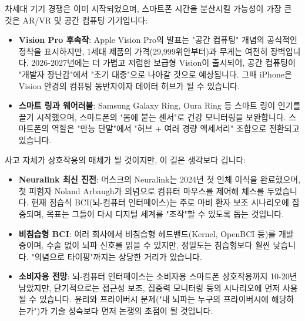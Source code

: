 


차세대 기기 경쟁은 이미 시작되었으며, 스마트폰 시간을 분산시킬 가능성이 가장 큰 것은 AR/VR 및 공간 컴퓨팅 기기입니다:

\begin{itemize}
  \item \textbf{Vision Pro 후속작}: Apple Vision Pro의 발표는 "공간 컴퓨팅" 개념의 공식적인 정착을 표시하지만, 1세대 제품의 가격(29,999위안부터)과 무게는 여전히 장벽입니다. 2026-2027년에는 더 가볍고 저렴한 보급형 Vision이 출시되어, 공간 컴퓨팅이 "개발자 장난감"에서 "초기 대중"으로 나아갈 것으로 예상됩니다. 그때 iPhone은 Vision 안경의 컴퓨팅 동반자이자 데이터 허브가 될 수 있습니다.
  \item \textbf{스마트 링과 웨어러블}: Samsung Galaxy Ring, Oura Ring 등 스마트 링이 인기를 끌기 시작했으며, 스마트폰의 "몸에 붙는 센서"로 건강 모니터링을 보완합니다. 스마트폰의 역할은 "만능 단말"에서 "허브 + 여러 경량 액세서리" 조합으로 전환되고 있습니다.
\end{itemize}


사고 자체가 상호작용의 매체가 될 것이지만, 이 길은 생각보다 깁니다:

\begin{itemize}
  \item \textbf{Neuralink 최신 진전}: 머스크의 Neuralink는 2024년 첫 인체 이식을 완료했으며, 첫 피험자 Noland Arbaugh가 의념으로 컴퓨터 마우스를 제어해 체스를 두었습니다. 현재 침습식 BCI(뇌-컴퓨터 인터페이스)는 주로 마비 환자 보조 시나리오에 집중되며, 목표는 그들이 다시 디지털 세계를 "조작"할 수 있도록 돕는 것입니다.
  \item \textbf{비침습형 BCI}: 여러 회사에서 비침습형 헤드밴드(Kernel, OpenBCI 등)를 개발 중이며, 수술 없이 뇌파 신호를 읽을 수 있지만, 정밀도는 침습형보다 훨씬 낮습니다. "의념으로 타이핑"까지는 상당한 거리가 있습니다.
  \item \textbf{소비자용 전망}: 뇌-컴퓨터 인터페이스는 소비자용 스마트폰 상호작용까지 10-20년 남았지만, 단기적으로는 접근성 보조, 집중력 모니터링 등의 시나리오에 먼저 사용될 수 있습니다. 윤리와 프라이버시 문제("내 뇌파는 누구의 프라이버시에 해당하는가")가 기술 성숙보다 먼저 논쟁의 초점이 될 것입니다.
\end{itemize}

